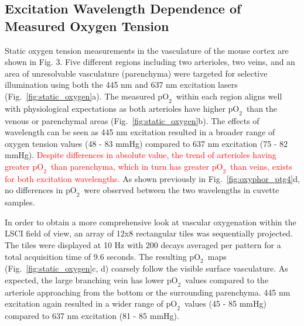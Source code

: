 \documentclass[12pt]{spieman}  %
\newcommand{\pO}{\ensuremath{\text{pO}_2}}
\begin{document}
\begin{spacing}{2}
\subsection{Excitation Wavelength Dependence of Measured Oxygen Tension}
Static oxygen tension measurements in the vasculature of the mouse cortex are shown in Fig. 3. Five different regions including two arterioles, two veins, and an area of unresolvable vasculature (parenchyma) were targeted for selective illumination using both the 445 nm and 637 nm excitation lasers (Fig.~\ref{fig:static_oxygen}a). The measured \pO\ within each region aligns well with physiological expectations as both arterioles have higher \pO\ than the venous or parenchymal areas (Fig.~\ref{fig:static_oxygen}b). The effects of wavelength can be seen as 445 nm excitation resulted in a broader range of oxygen tension values (48 - 83 mmHg) compared to 637 nm excitation (75 - 82 mmHg). \textcolor{red}{Despite differences in absolute value, the trend of arterioles having greater \pO\ than parenchyma, which in turn has greater \pO\ than veins, exists for both excitation wavelengths.} As shown previously in Fig.~\ref{fig:oxyphor_ptg4}d, no differences in \pO\ were observed between the two wavelengths in cuvette samples.

In order to obtain a more comprehensive look at vascular oxygenation within the LSCI field of view, an array of 12x8 rectangular tiles was sequentially projected. The tiles were displayed at 10 Hz with 200 decays averaged per pattern for a total acquisition time of 9.6 seconds. The resulting \pO\ maps (Fig.~\ref{fig:static_oxygen}c, d) coarsely follow the visible surface vasculature. As expected, the large branching vein has lower \pO\ values compared to the arteriole approaching from the bottom or the surrounding parenchyma. 445 nm excitation again resulted in a wider range of \pO\ values (45 - 85 mmHg) compared to 637 nm excitation (81 - 85 mmHg).


\end{spacing}
\end{document}
